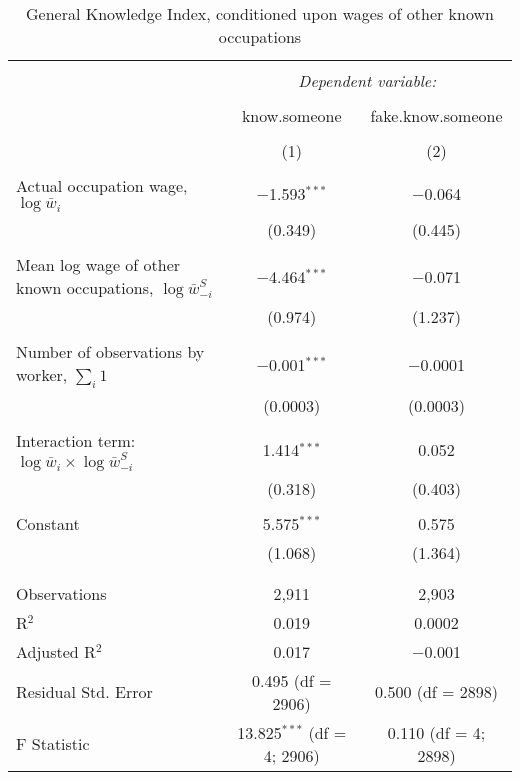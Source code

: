 
\begin{table}[!htbp] \centering 
  \caption{General Knowledge Index, conditioned upon wages of other known occupations} 
  \label{tab:clustering} 
\begin{tabular}{@{\extracolsep{5pt}}lcc} 
\\[-1.8ex]\hline 
\hline \\[-1.8ex] 
 & \multicolumn{2}{c}{\textit{Dependent variable:}} \\ 
\cline{2-3} 
\\[-1.8ex] & know.someone & fake.know.someone \\ 
\\[-1.8ex] & (1) & (2)\\ 
\hline \\[-1.8ex] 
 Actual occupation wage, $\log \bar{w}_i$ & $-$1.593$^{***}$ & $-$0.064 \\ 
  & (0.349) & (0.445) \\ 
  & & \\ 
 Mean log wage of other known occupations, $\log \bar{w}^S_{-i}$ & $-$4.464$^{***}$ & $-$0.071 \\ 
  & (0.974) & (1.237) \\ 
  & & \\ 
 Number of observations by worker, $\sum_i 1$ & $-$0.001$^{***}$ & $-$0.0001 \\ 
  & (0.0003) & (0.0003) \\ 
  & & \\ 
 Interaction term: $\log \bar{w}_i \times \log \bar{w}^S_{-i}$ & 1.414$^{***}$ & 0.052 \\ 
  & (0.318) & (0.403) \\ 
  & & \\ 
 Constant & 5.575$^{***}$ & 0.575 \\ 
  & (1.068) & (1.364) \\ 
  & & \\ 
\hline \\[-1.8ex] 
Observations & 2,911 & 2,903 \\ 
R$^{2}$ & 0.019 & 0.0002 \\ 
Adjusted R$^{2}$ & 0.017 & $-$0.001 \\ 
Residual Std. Error & 0.495 (df = 2906) & 0.500 (df = 2898) \\ 
F Statistic & 13.825$^{***}$ (df = 4; 2906) & 0.110 (df = 4; 2898) \\ 

\end{tabular}
\end{table}
